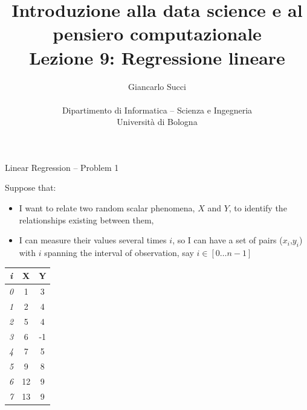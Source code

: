 \documentclass{beamer}
\title[L02]{Introduzione alla data science e al pensiero computazionale\\
Lezione 9: Regressione lineare} %
\author[{\tiny Giancarlo Succi }]{Giancarlo Succi\\\\ Dipartimento di Informatica -- Scienza e Ingegneria\\Universit\`{a} di Bologna\\
\bftt{g.succi@unibo.it}
} %
\institute[unibo] %
\date{} %
\begin{document}
\begin{frame}
\titlepage %

\end{frame}




\begin{frame}
{\centerline{Linear Regression -- Problem 1}}
Suppose that:
\begin{itemize}
\item  I want to relate two random scalar phenomena, $X$ and $Y$, to identify the relationships existing between them,
\item I can measure their values several times $i$, so I can have a set of pairs ($x_i$,$y_i$) with $i$ spanning the interval of observation, say $i \in [0 \ldots{} n-1]$
\end{itemize}

\begin{table}[h!]
\small
  \begin{center}
    \begin{tabular}{|c|c|c|}      
    \hline
     \textit{i} & \textbf{X} & \textbf{Y} \\
    \hline    \hline
	\textit{0} &1 & 3 \\
	\textit{1} &2 & 4 \\
	\textit{2} &5 & 4 \\
	\textit{3} &6 & -1 \\
	\textit{4} &7 & 5 \\
	\textit{5} &9 & 8 \\
	\textit{6} &12 & 9 \\
	\textit{7} &13 & 9 \\ \hline
    \end{tabular}
  \end{center}
\end{table}


\end{frame}
\end{document}
